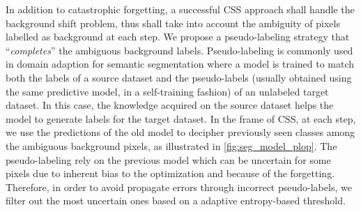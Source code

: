 In addition to catastrophic forgetting, a successful \ac{CSS} approach shall handle the background shift
problem, thus shall take into account the ambiguity of pixels labelled as background at each step.
We propose a pseudo-labeling strategy that ``\textit{completes}'' the ambiguous background labels.
Pseudo-labeling \cite{lee2013pseudolabel} is commonly used in domain adaption for semantic
segmentation
\cite{vu2019advent,li2019bidirectionallearning,zou2018classbalancedselftraining,saporta2020esl}
where a model is trained to match both the labels of a source dataset and the pseudo-labels (usually
obtained using the same predictive model, in a self-training fashion) of an unlabeled target
dataset. In this case, the knowledge acquired on the source dataset helps the model to generate
labels for the target dataset. In the frame of \ac{CSS}, at each step, we use the predictions of the old
model to decipher previously seen classes among the ambiguous background pixels, as illustrated in
\autoref{fig:seg_model_plop}. The pseudo-labeling rely on the previous model which can be uncertain
for some pixels due to inherent bias to the optimization and because of the forgetting. Therefore,
in order to avoid propagate errors through incorrect pseudo-labels, we filter out the most uncertain
ones based on a adaptive entropy-based threshold.

